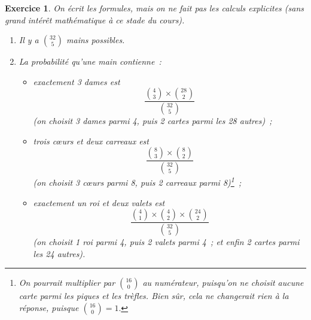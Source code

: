 \documentclass[10pt]{article}
\newtheorem{exo}{Exercice}
\begin{document}
\begin{exo}


On écrit les formules, mais on ne fait pas les calculs explicites (sans grand intérêt mathématique à ce stade du cours).

\begin{enumerate}
\item Il y a $\binom{32}{5}$ mains possibles.

\item La probabilité qu'une main contienne~:
\begin{itemize}
\item[\textbullet] exactement 3 dames est 
\[\frac{\binom{4}{3}\times \binom{28}{2}}{\binom{32}{5}}\] (on choisit 3 dames parmi 4, puis 2 cartes parmi les 28 autres)~;
\item[\textbullet] trois cœurs et deux carreaux est
\[\frac{\binom{8}{3}\times \binom{8}{2}}{\binom{32}{5}}\] (on choisit 3 cœurs parmi 8, puis 2 carreaux parmi 8)\footnote{On pourrait multiplier par $\binom{16}{0}$ au numérateur, puisqu'on ne choisit aucune carte parmi les piques et les trèfles. Bien sûr, cela ne changerait rien à la réponse, puisque $\binom{16}{0}=1.$}~;
\item[\textbullet] exactement un roi et deux valets est
\[\frac{\binom{4}{1}\times \binom{4}{2}\times\binom{24}{2}}{\binom{32}{5}}\] (on choisit 1 roi parmi 4, puis 2 valets parmi 4~; et enfin 2 cartes parmi les 24 autres).
\end{itemize}
\end{enumerate}
\end{exo}
\end{document}
